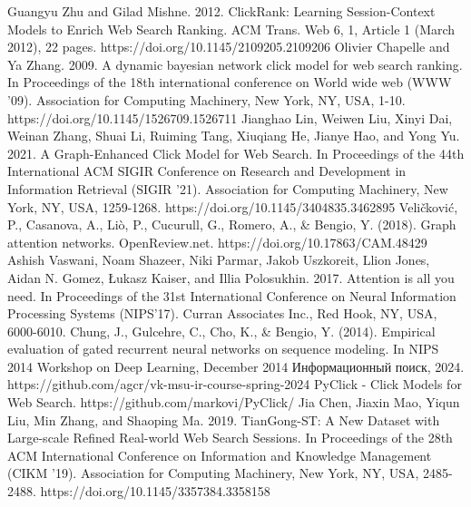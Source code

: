 \documentclass[diploma]{nanolab2015}
\begin{document}
\begin{thebibliography}{00}
    Guangyu Zhu and Gilad Mishne. 2012. ClickRank: Learning Session-Context Models to Enrich Web Search Ranking. ACM Trans. Web 6, 1, Article 1 (March 2012), 22 pages. https://doi.org/10.1145/2109205.2109206
    Olivier Chapelle and Ya Zhang. 2009. A dynamic bayesian network click model for web search ranking. In Proceedings of the 18th international conference on World wide web (WWW '09). Association for Computing Machinery, New York, NY, USA, 1-10. https://doi.org/10.1145/1526709.1526711
    Jianghao Lin, Weiwen Liu, Xinyi Dai, Weinan Zhang, Shuai Li, Ruiming Tang, Xiuqiang He, Jianye Hao, and Yong Yu. 2021. A Graph-Enhanced Click Model for Web Search. In Proceedings of the 44th International ACM SIGIR Conference on Research and Development in Information Retrieval (SIGIR '21). Association for Computing Machinery, New York, NY, USA, 1259-1268. https://doi.org/10.1145/3404835.3462895
    Veličković, P., Casanova, A., Liò, P., Cucurull, G., Romero, A., \& Bengio, Y. (2018). Graph attention networks. OpenReview.net. https://doi.org/10.17863/CAM.48429
    Ashish Vaswani, Noam Shazeer, Niki Parmar, Jakob Uszkoreit, Llion Jones, Aidan N. Gomez, Łukasz Kaiser, and Illia Polosukhin. 2017. Attention is all you need. In Proceedings of the 31st International Conference on Neural Information Processing Systems (NIPS'17). Curran Associates Inc., Red Hook, NY, USA, 6000-6010.
    Chung, J., Gulcehre, C., Cho, K., \& Bengio, Y. (2014). Empirical evaluation of gated recurrent neural networks on sequence modeling. In NIPS 2014 Workshop on Deep Learning, December 2014
    Информационный поиск, 2024. https://github.com/agcr/vk-msu-ir-course-spring-2024
    PyClick - Click Models for Web Search. https://github.com/markovi/PyClick/
    Jia Chen, Jiaxin Mao, Yiqun Liu, Min Zhang, and Shaoping Ma. 2019. TianGong-ST: A New Dataset with Large-scale Refined Real-world Web Search Sessions. In Proceedings of the 28th ACM International Conference on Information and Knowledge Management (CIKM '19). Association for Computing Machinery, New York, NY, USA, 2485-2488. https://doi.org/10.1145/3357384.3358158
\end{thebibliography}
\end{document}
